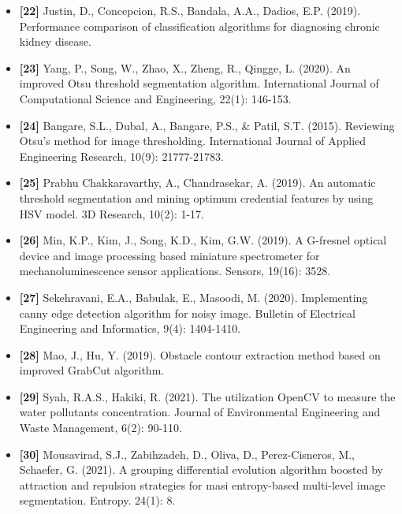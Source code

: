 \documentclass[12pt, a4paper]{article}
\begin{document}
\begin{itemize}[label=]
    \item \textbf{[22]} Justin, D., Concepcion, R.S., Bandala, A.A., Dadios, E.P. (2019). Performance comparison of classification algorithms for diagnosing chronic kidney disease.
    \item \textbf{[23]} Yang, P., Song, W., Zhao, X., Zheng, R., Qingge, L. (2020). An improved Otsu threshold segmentation algorithm. International Journal of Computational Science and Engineering, 22(1): 146-153.
    \item \textbf{[24]} Bangare, S.L., Dubal, A., Bangare, P.S., \& Patil, S.T. (2015). Reviewing Otsu's method for image thresholding. International Journal of Applied Engineering Research, 10(9): 21777-21783.
    \item \textbf{[25]} Prabhu Chakkaravarthy, A., Chandrasekar, A. (2019). An automatic threshold segmentation and mining optimum credential features by using HSV model. 3D Research, 10(2): 1-17.
    \item \textbf{[26]} Min, K.P., Kim, J., Song, K.D., Kim, G.W. (2019). A G-fresnel optical device and image processing based miniature spectrometer for mechanoluminescence sensor applications. Sensors, 19(16): 3528.
    \item \textbf{[27]} Sekehravani, E.A., Babulak, E., Masoodi, M. (2020). Implementing canny edge detection algorithm for noisy image. Bulletin of Electrical Engineering and Informatics, 9(4): 1404-1410.
    \item \textbf{[28]} Mao, J., Hu, Y. (2019). Obstacle contour extraction method based on improved GrabCut algorithm.
    \item \textbf{[29]} Syah, R.A.S., Hakiki, R. (2021). The utilization OpenCV to measure the water pollutants concentration. Journal of Environmental Engineering and Waste Management, 6(2): 90-110.
    \item \textbf{[30]} Mousavirad, S.J., Zabihzadeh, D., Oliva, D., Perez-Cisneros, M., Schaefer, G. (2021). A grouping differential evolution algorithm boosted by attraction and repulsion strategies for masi entropy-based multi-level image segmentation. Entropy. 24(1): 8.
\end{itemize}
\end{document}
